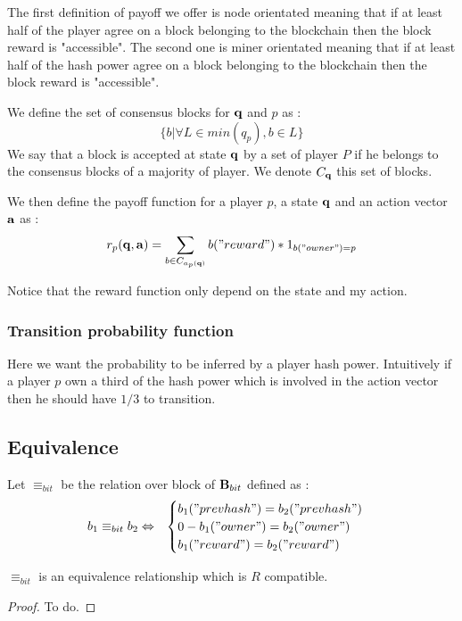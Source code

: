The first definition of payoff we offer is node orientated meaning that if at least half of the player agree on a block belonging to the blockchain then the block reward is "accessible". The second one is miner orientated meaning that if at least half of the hash power agree on a block belonging to the blockchain then the block reward is "accessible".

\begin{mydef}
	We define the set of consensus blocks for $\mathbf{q}$ and $p$ as :
	$$\{b | \forall L \in min(q_p), b \in L  \} $$  
	We say that a block is accepted at state $\mathbf{q}$ by a set of player $P$ if he belongs to the consensus blocks of a majority of player. We denote $C_{\mathbf{q}}$ this set of blocks.
\end{mydef}

We then define the payoff function for a player $p$, a state $\mathbf{q}$ and an action vector $\mathbf{a}$ as : 
$$ r_p(\mathbf{q},\mathbf{a}) = \sum_{b \in C_{a_p(\mathbf{q})}} b("reward") * 1_{b("owner")=p}$$


\begin{myrem}
	Notice that the reward function only depend on the state and my action.
\end{myrem}


\subsubsection{Transition probability function}
Here we want the probability to be inferred by a player hash power. Intuitively if a player $p$ own a third of the hash power which is involved in the action vector then he should have $1/3$ to transition. 



\subsection{Equivalence}

\begin{mydef}
	Let $\equiv_{bit}$ be the relation over block of $\text{\bf B}_{bit}$ defined as : 
	\begin{eqnarray*}
		b_1 \equiv_{bit} b_2 & \Leftrightarrow &
		\begin{cases}
			b_1("prevhash") = b_2("prevhash") \\0-
			b_1("owner") = b_2("owner") \\
			b_1("reward") = b_2("reward")
		\end{cases}\\
	\end{eqnarray*}
\end{mydef}

\begin{myprop}
	$\equiv_{bit}$ is an equivalence relationship which is $R$ compatible. 
\end{myprop}

\begin{proof}
	To do.
\end{proof}
